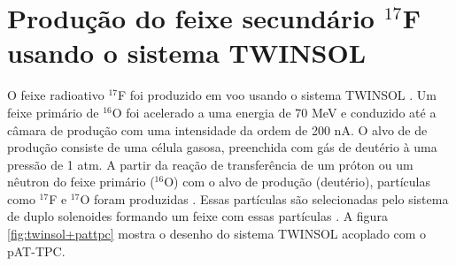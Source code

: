 \documentclass[a4paper,12pt,oneside]{book}
\begin{document}





\section{Produção do feixe secundário $^{17}$F usando o sistema TWINSOL}\label{sec:twinsol}

\par O feixe radioativo $^{17}$F foi produzido em voo usando o sistema TWINSOL \cite{KOLATA1989503, NDtandem}. Um feixe primário de $^{16}$O foi acelerado a uma energia de 70 MeV e conduzido até a câmara de produção com uma intensidade da ordem de 200 nA. O alvo de de produção consiste de uma célula gasosa, preenchida com gás de deutério à uma pressão de 1 atm. A partir da reação de transferência de um próton ou um nêutron do feixe primário ($^{16}$O) com o alvo de produção (deutério), partículas como $^{17}$F e $^{17}$O foram produzidas \cite{KOLATA1989503, twinsol}. Essas partículas são selecionadas pelo sistema de duplo solenoides formando um feixe com essas partículas \cite{twinsol, ribras_leo}. A figura \ref{fig:twinsol+pattpc} mostra o desenho do sistema TWINSOL acoplado com o pAT-TPC.
\end{document}
